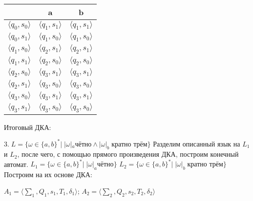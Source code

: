 \documentclass[a4paper,12pt]{article}
\begin{document}
\begin{center}
\begin{tabular}{ |c|c|c| } 
\hline
  & a & b \\ [0.5ex] 
 \hline
 $\langle q_0 , s_0 \rangle$ & $\langle q_1 , s_1 \rangle$ & $\langle q_1 , s_1 \rangle$ \\ 
 $\langle q_0 , s_1 \rangle $ & $\langle q_1 , s_0 \rangle$ & $\langle q_1 , s_0 \rangle$ \\ 
 $\langle q_1 , s_0 \rangle $ & $\langle q_2 , s_1 \rangle$ & $\langle q_2 , s_1 \rangle$ \\ 
 $\langle q_1 , s_1 \rangle $ & $\langle q_2 , s_0 \rangle$ & $\langle q_2 , s_0 \rangle$ \\ 
 $\langle q_2 , s_0 \rangle $ & $\langle q_3 , s_1 \rangle$ & $\langle q_3 , s_1 \rangle$ \\
 $\langle q_2 , s_1 \rangle $ & $\langle q_3 , s_0 \rangle$ & $\langle q_3 , s_0 \rangle$ \\
 $\langle q_3 , s_0 \rangle $ & $\langle q_3 , s_1 \rangle$ & $\langle q_3 , s_1 \rangle$ \\
 $\langle q_3 , s_1 \rangle $ & $\langle q_3 , s_0 \rangle$ & $\langle q_3 , s_0 \rangle$ \\
 \hline
\end{tabular}
\end{center}
Итоговый ДКА:
\begin{center}
\newline
\end{center}
\Large $3.\;L = {\{\omega \in \{a,b\}^*|\;|\omega|_a \text{чётно}\land|\omega|_b \; \text{кратно трём}\}}$\newline
Разделим описанный язык на $L_1$ и $L_2$, после чего, с помощью прямого произведения ДКА, построим конечный автомат.\newline
\Large $L_1 = {\{\omega \in \{a,b\}^*|\;|\omega|_a \text{чётно}\}}$\newline
\Large $L_2 = {\{\omega \in \{a,b\}^*|\;|\omega|_b \; \text{кратно трём}\}}$\newline
Построим на их основе ДКА:\newline
\begin{center}
\newline
{}\newline
\end{center}
$A_1 = {\langle\sum_1 , Q_1, s_1, T_1, \delta_1 \rangle}$;
$A_2 = {\langle\sum_2 , Q_2, s_2, T_2, \delta_2 \rangle}$\newline
\end{document}
